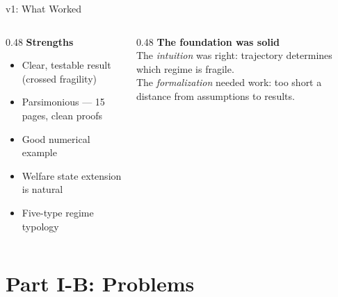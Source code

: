 \documentclass[
  ignorenonframetext,
  aspectratio=169]{beamer}
\begin{document}
\begin{frame}{v1: What Worked}
\protect{}\label{v1-what-worked}
\begin{columns}[T]
\begin{column}{0.48\textwidth}
\textcolor{myTeal}{\textbf{Strengths}}
\begin{itemize}
  \item Clear, testable result (crossed fragility)
  \item Parsimonious --- 15 pages, clean proofs
  \item Good numerical example
  \item Welfare state extension is natural
  \item Five-type regime typology
\end{itemize}
\end{column}
\begin{column}{0.48\textwidth}
\textcolor{myAmber}{\textbf{The foundation was solid}}\\[6pt]
The \emph{intuition} was right: trajectory determines which regime is fragile.\\[6pt]
The \emph{formalization} needed work: too short a distance from assumptions to results.
\end{column}
\end{columns}
\end{frame}

\section{Part I-B: Problems}\label{part-i-b-problems}
\end{document}

